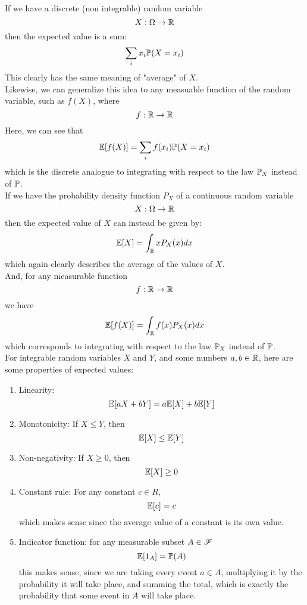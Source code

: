 \documentclass[12pt]{article}
\begin{document}
    If we have a discrete (non integrable)
    random variable
    \[ X: \Omega \to \mathbb{R} \]
    then the expected value is a sum:
    \[ \sum_{i}x_i\mathbb{P}(X = x_i) \]
    This clearly has the same meaning
    of "average" of $X$. \\

    Likewise, we can generalize this idea
    to any measuable function of the random variable,
    such as $f(X)$, where
    \[ f: \mathbb{R} \to \mathbb{R} \]
    Here, we can see that
    \[ \mathbb{E}[f(X)] = \sum_{i}f(x_i)\mathbb{P}(X = x_i) \]
    which is the discrete analogue to
    integrating with respect to the law
    $\mathbb{P}_X$ instead of $\mathbb{P}$. \\

    If we have the probability
    density function $P_X$ of a continuous
    random variable
    \[ X: \Omega \to \mathbb{R} \]
    then the expected value of $X$
    can instead be given by:
    \[ \mathbb{E}[X] = \int_{\mathbb{R}} x P_X(x) dx \]
    which again clearly describes the average
    of the values of $X$. \\
    
    And, for any measurable function
    \[ f: \mathbb{R} \to \mathbb{R} \]
    we have
    \[ \mathbb{E}[f(X)] = \int_{\mathbb{R}} f(x)P_X(x) dx \]
    which corresponds to
    integrating with respect to the law
    $\mathbb{P}_X$ instead of $\mathbb{P}$. \\

    For integrable random variables $X$ and $Y$,
    and some numbers $a, b \in \mathbb{R}$,
    here are some properties of expected values:
    \begin{enumerate}
        \item 
        Linearity:
        \[ \mathbb{E}[aX + bY] = a\mathbb{E}[X] + b\mathbb{E}[Y] \]
        \item 
        Monotonicity: If $X \leq Y$, then 
        \[ \mathbb{E}[X] \leq \mathbb{E}[Y] \]
        \item
        Non-negativity: If $X \geq 0$, then
        \[ \mathbb{E}[X] \geq 0 \]
        \item
        Constant rule: For any constant $c \in R$,
        \[ \mathbb{E}[c] = c \]
        which makes sense since the average value
        of a constant is its own value.
        \item
        Indicator function:
        for any measurable subset $A \in \mathscr{F}$
        \[ \mathbb{E}[1_A] = \mathbb{P}(A) \]
        this makes sense, since
        we are taking every event $a \in A$,
        multiplying it by the probability
        it will take place, and summing the total,
        which is exactly the probability that
        some event in $A$ will take place. \\
    \end{enumerate}
\end{document}

